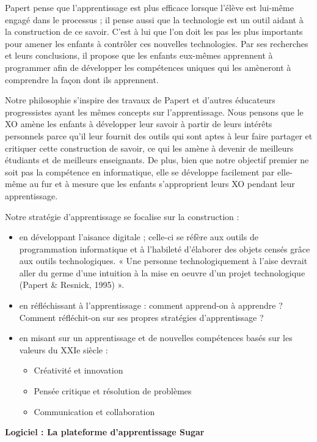 \documentclass[12pt]{article}
\begin{document}
Papert pense que l'apprentissage est plus efficace lorsque l'élève est
lui-même engagé dans le processus ; il pense aussi que la technologie est
un outil aidant à la construction de ce savoir. C'est à lui que l'on doit
les pas les plus importants pour amener les enfants à contrôler ces
nouvelles technologies. Par ses recherches et leurs conclusions, il propose
que les enfants eux-mêmes apprennent à programmer afin de développer les
compétences uniques qui les amèneront à comprendre la façon dont ils
apprennent.

Notre philosophie s'inspire des travaux de Papert et d'autres éducateurs
progressistes ayant les mêmes concepts sur l'apprentissage. Nous pensons
que le XO amène les enfants à développer leur savoir à partir de leurs
intérêts personnels parce qu'il leur fournit des outils qui sont aptes à
leur faire partager et critiquer cette construction de savoir, ce qui les
amène à devenir de meilleurs étudiants et de meilleurs enseignants. De
plus, bien que notre objectif premier ne soit pas la compétence en
informatique, elle se développe facilement par elle-même au fur et à mesure
que les enfants s'approprient leurs XO pendant leur apprentissage.

Notre stratégie d'apprentissage se focalise sur la construction :

\begin{itemize}
\item en développant l'aisance digitale ; celle-ci se réfère aux outils de
  programmation informatique et à l'habileté d'élaborer des objets censés
  grâce aux outils technologiques. « Une personne technologiquement à
  l'aise devrait aller du germe d'une intuition à la mise en oeuvre d'un
  projet technologique (Papert \& Resnick, 1995) ».
\item en réfléchissant à l'apprentissage : comment apprend-on à apprendre ?
  Comment réfléchit-on sur ses propres stratégies d'apprentissage ?
\item en misant sur un apprentissage et de nouvelles compétences basés sur les
  valeurs du XXIe siècle :
\begin{itemize}
\item Créativité et innovation
\item Pensée critique et résolution de problèmes
\item Communication et collaboration
\end{itemize}
\end{itemize}

\textbf{Logiciel : La plateforme d'apprentissage Sugar}
\end{document}
